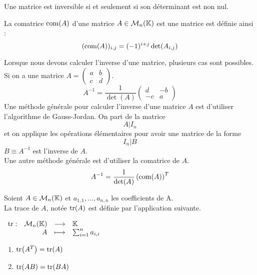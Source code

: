 \begin{proposition}
	Une matrice est inversible si et seulement si son déterminant est non nul.
\end{proposition}

\begin{definition}[Comatrice]
	La comatrice $\operatorname{com}(A)$ d'une matrice $A \in \mathcal{M}_n(\mathbb{K})$ est une matrice est définie ainsi :
	\[ (\operatorname{com}(A))_{i,j} = (-1)^{i+j} \det(A_{i,j}) \]
\end{definition}

Lorsque nous devons calculer l'inverse d'une matrice, plusieurs cas sont possibles.
    Si on a une matrice
    $A =
    \begin{pmatrix}
        a & b \\
        c & d
    \end{pmatrix}
    $.
    \[
    A^{-1} = \frac{1}{\det(A)} 
    \begin{pmatrix}
        d & -b \\
        -c & a
    \end{pmatrix}
    \]
    Une méthode générale pour calculer l'inverse d'une matrice $A$ est d'utiliser l'algorithme de Gauss-Jordan.
    On part de la matrice 
    \[ A|I_n \]
    et on applique les opérations élémentaires pour avoir une matrice de la forme
    \[I_n|B\]
    $B \equiv A^{-1}$ est l'inverse de $A$.
    \\
    Une autre méthode générale est d'utiliser la comatrice de $A$.
    \[ A^{-1} = \frac{1}{\det(A)} \left( \operatorname{com}(A) \right)^T \]

\begin{definition}
	Soient $A \in \mathcal{M}_n(\mathbb{K})$ et $a_{1,1}, \ldots, a_{n,n}$ les coefficients de A. 
	\\
	La trace de $A$, notée $\tr(A)$ est définie par l'application suivante.
	\begin{center}
		$
		\begin{array}{rrcl} \tr : & \mathcal{M}_n(\mathbb{K}) & \longrightarrow & \mathbb{K} \\ & A & \longmapsto & \sum_{i=1}^n a_{i,i} \end{array}
		$
	\end{center}
\end{definition}

\begin{lemma}
	\begin{multicols}{2}
	    \begin{enumerate}
    		\item $\tr(A^T) = \tr(A)$
    		\item $\tr(A B) = \tr(B A)$
    	\end{enumerate}
	\end{multicols}
\end{lemma}


